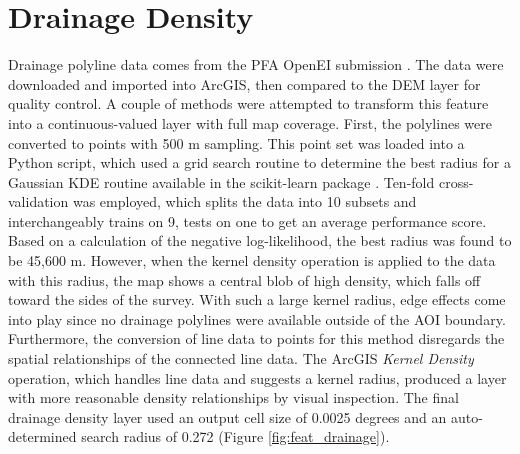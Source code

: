 \section{Drainage Density}\label{app:dl_drainage_density}
Drainage polyline data comes from the \citet{bielicki_hydrogeolgic_2015} PFA OpenEI submission \citep{kelley_geothermal_2015}. The data were downloaded and imported into ArcGIS, then compared to the DEM layer for quality control. A couple of methods were attempted to transform this feature into a continuous-valued layer with full map coverage. First, the polylines were converted to points with 500 m sampling. This point set was loaded into a Python script, which used a grid search routine to determine the best radius for a Gaussian KDE routine available in the scikit-learn package \citep{pedregosa_scikit-learn_2011}. Ten-fold cross-validation was employed, which splits the data into 10 subsets and interchangeably trains on 9, tests on one to get an average performance score. Based on a calculation of the negative log-likelihood, the best radius was found to be 45,600 m. However, when the kernel density operation is applied to the data with this radius, the map shows a central blob of high density, which falls off toward the sides of the survey. With such a large kernel radius, edge effects come into play since no drainage polylines were available outside of the AOI boundary. Furthermore, the conversion of line data to points for this method disregards the spatial relationships of the connected line data. The ArcGIS \textit{Kernel Density} operation, which handles line data and suggests a kernel radius, produced a layer with more reasonable density relationships by visual inspection. The final drainage density layer used an output cell size of 0.0025 degrees and an auto-determined search radius of 0.272 (Figure \ref{fig:feat_drainage}).
\vfill
\pagebreak

